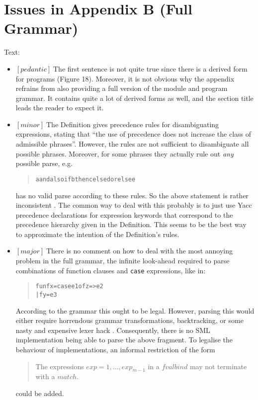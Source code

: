 \documentclass{article}
\newcommand{\m}[1]{$[\mathit{#1}]\;$}
\newcommand{\major}{\m{major}}
\newcommand{\minor}{\m{minor}}
\newcommand{\pedantic}{\m{pedantic}}
\begin{document}
\section{Issues in Appendix B (Full Grammar)}
\label{bugsappendixb}

Text:
\nopagebreak

\begin{itemize}
\item \pedantic The first sentence is not quite true since there is a derived form for programs (Figure 18). Moreover, it is not obvious why the appendix refrains from also providing a full version of the module and program grammar. It contains quite a lot of derived forms as well, and the section title leads the reader to expect it.

\item \minor The Definition gives precedence rules for disambiguating expressions, stating that ``the use of precedence does not increase the class of admissible phrases''. However, the rules are not sufficient to disambiguate all possible phrases. Moreover, for some phrases they actually rule out {\em any} possible parse, e.g.
\begin{quote}
\begin{alltt}
a andalso if b then c else d orelse e
\end{alltt}
\end{quote}
has no valid parse according to these rules. So the above statement is rather inconsistent \cite{mistakes}. The common way to deal with this probably is to just use Yacc precedence declarations for expression keywords that correspond to the precedence hierarchy given in the Definition. This seems to be the best way to approximate the intention of the Definition's rules.

\item \major There is no comment on how to deal with the most annoying problem in the full grammar, the infinite look-ahead required to parse combinations of function clauses and {\tt case} expressions, like in:
\begin{quote}
\begin{alltt}
fun f x = case e1 of z => e2
  | f y = e3
\end{alltt}
\end{quote}
According to the grammar this ought to be legal. However, parsing this would either require horrendous grammar transformations, backtracking, or some nasty and expensive lexer hack \cite{mistakes}. Consequently, there is no SML implementation being able to parse the above fragment. To legalise the behaviour of implementations, an informal restriction of the form
\begin{quote}
The expressions $\mathit{exp}=1,\dots,\mathit{exp}_{m-1}$ in a $\mathit{fvalbind}$ may not terminate with a $\mathit{match}$.
\end{quote}
could be added.
\end{itemize}
\end{document}
